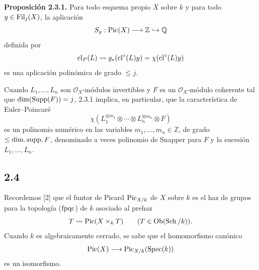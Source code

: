 \textbf{Proposición 2.3.1.} Para todo esquema propio $X$ sobre $k$ y para
todo $y\in\Filt_j(X)$, la aplicación
\[
S_y:\operatorname{Pic}(X)\longrightarrow\mathbb Z\hookrightarrow\mathbb Q
\]
definida por
\[
\operatorname{cl}_P(L)\rightsquigarrow g_*(\operatorname{cl}^\circ(L)y)=\chi(\operatorname{cl}^\circ(L)y)
\]
es una aplicación polinómica de grado $\leq j$.

Cuando $L_1,\ldots,L_n$ son $\mathcal O_X$-módulos invertibles y $F$ es un
$\mathcal O_X$-módulo coherente tal que $\dim(\operatorname{Supp}(F))=j$, 2.3.1 implica,
en particular, que la característica de Euler--Poincaré
\begin{equation}\tag{2.3.2}
\chi(L_1^{\otimes m_1}\otimes\cdots\otimes L_n^{\otimes m_n}\otimes F)
\end{equation}
es un polinomio numérico en las variables $m_1,\ldots,m_n\in\mathbb Z$, de
grado $\leq\operatorname{dim.}\operatorname{supp.}F$, denominado a veces polinomio de
Snapper para $F$ y la sucesión $L_1,\ldots,L_n$.

\subsection*{2.4}
Recordemos [2] que el funtor de Picard $\operatorname{Pic}_{X/k}$ de $X$ sobre $k$ es el
haz de grupos para la topología ($\fpqc$) de $k$ asociado al prehaz
\[
T\rightsquigarrow \Pic(X\times_kT)\qquad
(T\in\operatorname{Ob}(\Sch/k)).
\]
Cuando $k$ es algebraicamente cerrado, se sabe que el homomorfismo canónico
\[
\Pic(X)\longrightarrow\Pic_{X/k}(\Spec(k))
\]
es un isomorfismo.

\providecommand{\Filt}{\operatorname{Fil}}
\providecommand{\fpqc}{\mathrm{fpqc}}
\providecommand{\Sch}{\operatorname{Sch}}
\providecommand{\Ob}{\operatorname{ob}}
\providecommand{\Gm}{\mathbb G_m}
\providecommand{\Der}{\operatorname{Der}}
\providecommand{\SL}{\operatorname{SL}}
\providecommand{\Aut}{\operatorname{Aut}}
\providecommand{\Mod}{\operatorname{Mod}}
\providecommand{\Tors}{\operatorname{Tors}}
\providecommand{\Mat}{\operatorname{Mat}}
\providecommand{\len}{\operatorname{long}}
\providecommand{\id}{\operatorname{id}}
\providecommand{\Spec}{\operatorname{Spec}}
\providecommand{\Picf}{\operatorname{Pic}}
\providecommand{\Ens}{\operatorname{Ens}}
\providecommand{\clp}{\operatorname{cl}_{P}}
\providecommand{\clo}{\operatorname{cl}^{\circ}}
\providecommand{\clb}{\operatorname{cl}_{\bullet}}
\providecommand{\Grb}{\operatorname{Gr}_{\bullet}}
\providecommand{\Gro}{\operatorname{Gr}^{\bullet}}
\providecommand{\longO}[1]{\operatorname{length}_{#1}}

